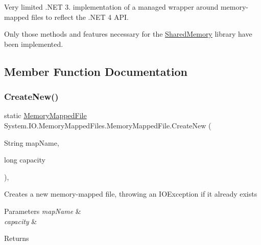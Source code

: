 Very limited .N\+ET 3. implementation of a managed wrapper around memory-\/mapped files to reflect the .N\+ET 4 A\+PI.

Only those methods and features necessary for the \hyperlink{namespace_shared_memory}{Shared\+Memory} library have been implemented.

\subsection{Member Function Documentation}
\mbox{\label{class_system_1_1_i_o_1_1_memory_mapped_files_1_1_memory_mapped_file_a00c2f72365b2a60d4d5898afd02b2616}} 
\subsubsection{\texorpdfstring{Create\+New()}{CreateNew()}}
{\footnotesize\ttfamily static \hyperlink{class_system_1_1_i_o_1_1_memory_mapped_files_1_1_memory_mapped_file}{Memory\+Mapped\+File} System.\+I\+O.\+Memory\+Mapped\+Files.\+Memory\+Mapped\+File.\+Create\+New (\begin{DoxyParamCaption}\item[{String}]{map\+Name,  }\item[{long}]{capacity }\end{DoxyParamCaption})\hspace{0.3cm}{\ttfamily [inline]}, {\ttfamily [static]}}



Creates a new memory-\/mapped file, throwing an I\+O\+Exception if it already exists 


\begin{DoxyParams}{Parameters}
{\em map\+Name} & \\
\hline
{\em capacity} & \\
\hline
\end{DoxyParams}
\begin{DoxyReturn}{Returns}

\end{DoxyReturn}
\mbox{\label{class_system_1_1_i_o_1_1_memory_mapped_files_1_1_memory_mapped_file_a5072661df52505e95faff64acc0fc026}} 
